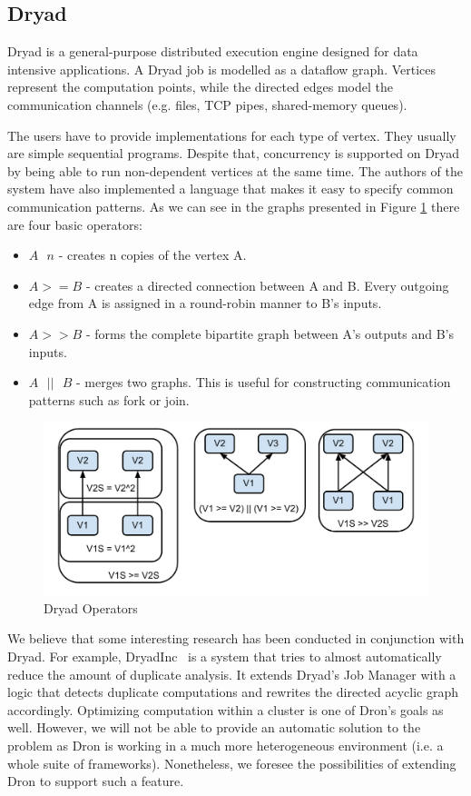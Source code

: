 \documentclass[11pt,a4paper,twoside]{report}
\begin{document}
\subsection{Dryad}
Dryad is a general-purpose distributed execution engine designed for data intensive applications. A Dryad job is modelled as a dataflow graph. Vertices represent the computation points, while the directed edges model the communication channels (e.g. files, TCP pipes, shared-memory queues).


The users have to provide implementations for each type of vertex. They usually are simple sequential programs. Despite that, concurrency is supported on Dryad by being able to run non-dependent vertices at the same time. The authors of the system have also implemented a language that makes it easy to specify common communication patterns. As we can see in the graphs presented in Figure \ref{fig:Dryad} there are four basic operators:

\begin{itemize}
\item{}
\(A \text{ \^{} } n\) - creates n copies of the vertex A.
\item{}
\(A >= B\) - creates a directed connection between A and B. Every outgoing edge from A is assigned in a round-robin manner to B's inputs.
\item{}
\(A >> B\) - forms the complete bipartite graph between A's outputs and B's inputs.
\item{}
\(A \text{ } || \text{ } B\) - merges two graphs. This is useful for constructing communication patterns such as fork or join.
\end{itemize}

\begin{figure}[h]
\centering
\includegraphics[scale=0.78]{Dryad}
\caption{Dryad Operators}
\label{fig:Dryad}
\end{figure}


We believe that some interesting research has been conducted in conjunction with Dryad. For example, DryadInc~\cite{DryadInc} is a system that tries to almost automatically reduce the amount of duplicate analysis. It extends Dryad's Job Manager with a logic that detects duplicate computations and rewrites the directed acyclic graph accordingly. Optimizing computation within a cluster is one of Dron's goals as well. However, we will not be able to provide an automatic solution to the problem as Dron is working in a much more heterogeneous environment (i.e. a whole suite of frameworks). Nonetheless, we foresee the possibilities of extending Dron to support such a feature.
\end{document}
